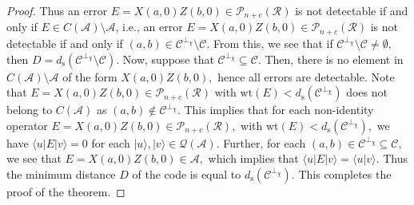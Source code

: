 \documentclass{article}
\theoremstyle{remark}
\theoremstyle{definition}
\numberwithin{equation}{section}
\begin{document}
\begin{proof}
Thus an error $E= X(a,0)Z(b,0) \in \mathcal{P}_{n+c}(\mathcal{R})$ is not detectable if and only if $E \in C(\mathcal{A}) \setminus \mathcal{A}$,  i.e., an error $E= X(a,0)Z(b,0) \in \mathcal{P}_{n+c}(\mathcal{R})$ is not detectable if and only if $(a,b) \in \mathcal{C}^{\perp_\chi} \setminus \mathcal{C}.$  From this, we see that if $\mathcal{C}^{\perp_\chi} \setminus \mathcal{C} \not=  \emptyset,$ then $D=d_{\mathrm{s}}(\mathcal{C}^{\perp_\chi}\setminus \mathcal{C}).$ Now, suppose that $\mathcal{C}^{\perp_\chi} \subseteq \mathcal{C}.$  Then, there is no element in  $C(\mathcal{A}) \setminus \mathcal{A}$ of the form  $X(a,0)Z(b,0),$ hence all errors are detectable. Note that  $E=X(a,0)Z(b,0) \in \mathcal{P}_{n+c}(\mathcal{R})$ with $\text{wt}(E) < d_{\mathrm{s}}(\mathcal{C}^{\perp_\chi})$ does not belong to $C(\mathcal{A})$ as $(a,b) \not \in \mathcal{C}^{\perp_\chi} .$ This implies that for each non-identity operator $E=X(a,0)Z(b,0) \in \mathcal{P}_{n+c}(\mathcal{R}),$ with $\text{wt}(E) < d_{\mathrm{s}}(\mathcal{C}^{\perp_\chi}),$ we have $\langle u | E| v \rangle=0$ for each $| u \rangle, | v \rangle \in \mathcal{Q}(\mathcal{A})$.  Further,  for each $(a,b) \in \mathcal{C}^{\perp_\chi}\subseteq \mathcal{C},$ we see that $E =X(a,0)Z(b,0) \in \mathcal{A},$ which implies that $ \langle u | E| v \rangle=\langle u | v \rangle.$ Thus the minimum distance $D$ of the code is equal to $d_{\mathrm{s}}(\mathcal{C}^{\perp_\chi}).$ This completes the proof of the theorem.\end{proof}
\end{document}
